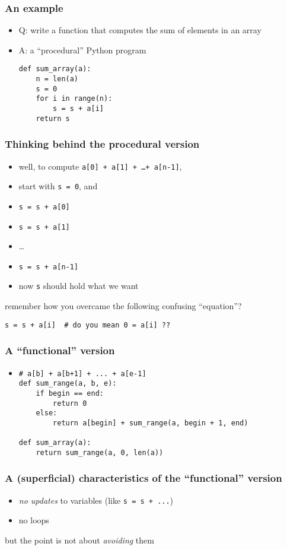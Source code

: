 \documentclass[12pt,dvipdfmx]{beamer}
\newcommand{\ao}[1]{{\color{blue}#1}}
\begin{document}
\begin{frame}[fragile]
  \frametitle{An example}
  \begin{itemize}
  \item Q: write a function that computes the sum of elements in an array
  \item A: a ``procedural'' Python program
\begin{lstlisting}
def sum_array(a):
    n = len(a)
    s = 0
    for i in range(n):
        s = s + a[i]
    return s
\end{lstlisting}
  \end{itemize}
\end{frame}

\begin{frame}[fragile]
  \frametitle{Thinking behind the procedural version}
  \begin{itemize}
  \item well, to compute {\tt a[0] + a[1] + \ldots + a[n-1]}, 
  \item start with {\tt s = 0}, and
  \item {\tt s = s + a[0]}
  \item {\tt s = s + a[1]}
  \item \ldots
  \item {\tt s = s + a[n-1]}
  \item now {\tt s} should hold what we want
  \end{itemize}
remember how you overcame the following confusing ``equation''?
\begin{lstlisting}
s = s + a[i]  # do you mean 0 = a[i] ??
\end{lstlisting}
\end{frame}

\begin{frame}[fragile]
  \frametitle{A ``functional'' version}
  \begin{itemize}
  \item []
\begin{lstlisting}
# a[b] + a[b+1] + ... + a[e-1]
def sum_range(a, b, e):
    if begin == end:
        return 0
    else:
        return a[begin] + sum_range(a, begin + 1, end)

def sum_array(a):
    return sum_range(a, 0, len(a))
\end{lstlisting}
\end{itemize}
\end{frame}

\begin{frame}[fragile]
  \frametitle{A (superficial) characteristics of the ``functional'' version}
  \begin{itemize}
  \item {\it no updates} to variables (like {\tt s = s + ...})
  \item no loops
  \end{itemize}
  but the point is not about \ao{\it avoiding} them
\end{frame}
\end{document}
